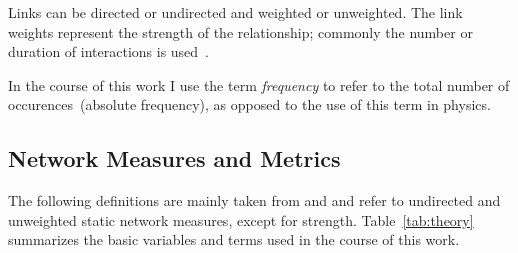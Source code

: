 Links can be directed or undirected and weighted or unweighted. The link weights represent the strength of the relationship; commonly the number or duration of interactions is used~\cite{farine2015constructing}.

In the course of this work I use the term \emph{frequency} to refer to the total number of occurences~(absolute frequency), as opposed to the use of this term in physics. 

\subsection{Network Measures and Metrics}
\label{sec:definitions}
The following definitions are mainly taken from \textcite{barabasi2016network} and \textcite{newman2010networks} and refer to undirected and unweighted static network measures, except for strength.
Table~\ref{tab:theory} summarizes the basic variables and terms used in the course of this work.

